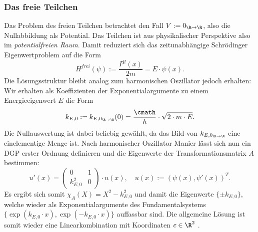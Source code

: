 \documentclass[../main.tex]{subfiles}
\begin{document}
        \subsubsection{Das freie Teilchen}
            Das Problem des freien Teilchen betrachtet den Fall $V:=0_{\R\to\R}$, also die Nullabbildung als Potential. Das Teilchen ist aus physikalischer Perspektive also im \emph{potentialfreien Raum}. Damit reduziert sich das zeitunabhängige Schrödinger Eigenwertproblem auf die Form 
            \[
                H^\textit{frei}(\psi):= \frac{P^2(x)}{2m} = E\cdot\psi(x).
            \]
            Die Lösungsstruktur bleibt analog zum harmonischen Oszillator jedoch erhalten: Wir erhalten als Koeffizienten der Exponentialargumente zu einem Energieeigenwert $E$ die Form 
            \[
                k_{E,0} := k_{E,0_{\R\to\R}}(0) = \frac{\cmath}{\hbar}\cdot\sqrt{2\cdot m\cdot E}. 
            \]
            Die Nullauswertung ist dabei beliebig gewählt, da das Bild von $k_{E,0_{\R\to\R}}$ eine einelementige Menge ist. Nach harmonischer Oszillator Manier lässt sich nun ein DGP erster Ordnung definieren und die Eigenwerte der Transformationsmatrix $A$ bestimmen:
            \[
                u'(x) = \begin{pmatrix}
                    0 & 1\\
                    k_{E,0}^2 & 0
                \end{pmatrix}\cdot u(x),\quad u(x):=(\psi(x), \psi'(x))^T.
            \]
            Es ergibt sich somit $\chi_A(X) = X^2 - k_{E,0}^2$ und damit die Eigenwerte $\{\pm k_{E,0}\}$, welche wieder als Exponentialargumente des Fundamentalsystems $\{\exp(k_{E,0}\cdot x), \exp(-k_{E,0}\cdot x)\}$ auffassbar sind. Die allgemeine Lösung ist somit wieder eine Linearkombination mit Koordinaten $c\in\R^2$ \cite[p.28f,p.38ff]{git:IK4T,junk:Ana3}.
            
\end{document}
